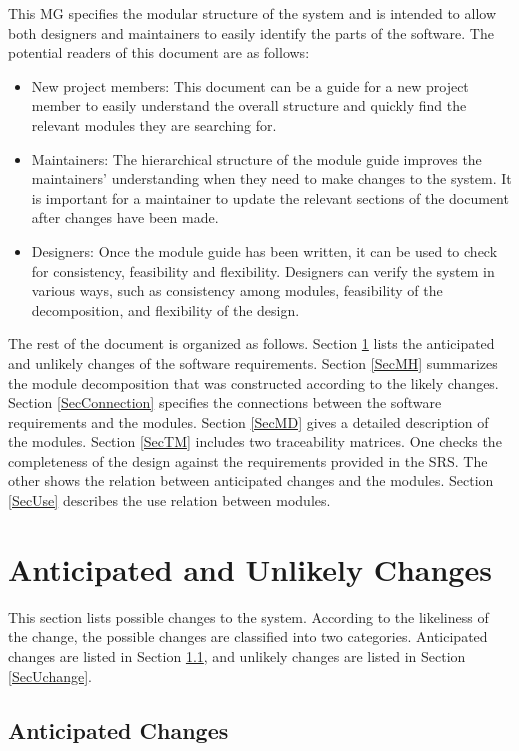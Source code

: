 \documentclass[12pt, titlepage]{article}
\begin{document}
This MG specifies the modular structure of the system and is intended to allow both
designers and maintainers to easily identify the parts of the software.  The
potential readers of this document are as follows:

\begin{itemize}
\item New project members: This document can be a guide for a new project member
  to easily understand the overall structure and quickly find the
  relevant modules they are searching for.
\item Maintainers: The hierarchical structure of the module guide improves the
  maintainers' understanding when they need to make changes to the system. It is
  important for a maintainer to update the relevant sections of the document
  after changes have been made.
\item Designers: Once the module guide has been written, it can be used to
  check for consistency, feasibility and flexibility. Designers can verify the
  system in various ways, such as consistency among modules, feasibility of the
  decomposition, and flexibility of the design.
\end{itemize}

The rest of the document is organized as follows. Section
\ref{SecChange} lists the anticipated and unlikely changes of the software
requirements. Section \ref{SecMH} summarizes the module decomposition that
was constructed according to the likely changes. Section \ref{SecConnection}
specifies the connections between the software requirements and the
modules. Section \ref{SecMD} gives a detailed description of the
modules. Section \ref{SecTM} includes two traceability matrices. One checks
the completeness of the design against the requirements provided in the SRS. The
other shows the relation between anticipated changes and the modules. Section
\ref{SecUse} describes the use relation between modules.

\section{Anticipated and Unlikely Changes} \label{SecChange}

This section lists possible changes to the system. According to the likeliness
of the change, the possible changes are classified into two
categories. Anticipated changes are listed in Section \ref{SecAchange}, and
unlikely changes are listed in Section \ref{SecUchange}.

\subsection{Anticipated Changes} \label{SecAchange}
\end{document}
